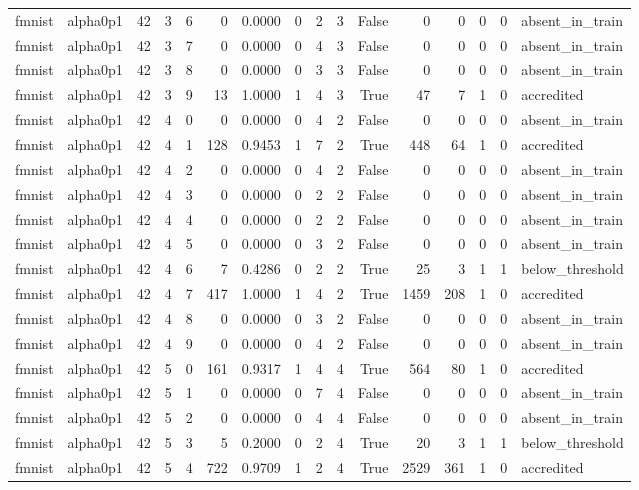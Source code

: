 \begin{tabular}{llrrrrrrrrrrrrrl}
fmnist & alpha0p1 & 42 & 3 & 6 & 0 & 0.0000 & 0 & 2 & 3 & False & 0 & 0 & 0 & 0 & absent\_in\_train \\
fmnist & alpha0p1 & 42 & 3 & 7 & 0 & 0.0000 & 0 & 4 & 3 & False & 0 & 0 & 0 & 0 & absent\_in\_train \\
fmnist & alpha0p1 & 42 & 3 & 8 & 0 & 0.0000 & 0 & 3 & 3 & False & 0 & 0 & 0 & 0 & absent\_in\_train \\
fmnist & alpha0p1 & 42 & 3 & 9 & 13 & 1.0000 & 1 & 4 & 3 & True & 47 & 7 & 1 & 0 & accredited \\
fmnist & alpha0p1 & 42 & 4 & 0 & 0 & 0.0000 & 0 & 4 & 2 & False & 0 & 0 & 0 & 0 & absent\_in\_train \\
fmnist & alpha0p1 & 42 & 4 & 1 & 128 & 0.9453 & 1 & 7 & 2 & True & 448 & 64 & 1 & 0 & accredited \\
fmnist & alpha0p1 & 42 & 4 & 2 & 0 & 0.0000 & 0 & 4 & 2 & False & 0 & 0 & 0 & 0 & absent\_in\_train \\
fmnist & alpha0p1 & 42 & 4 & 3 & 0 & 0.0000 & 0 & 2 & 2 & False & 0 & 0 & 0 & 0 & absent\_in\_train \\
fmnist & alpha0p1 & 42 & 4 & 4 & 0 & 0.0000 & 0 & 2 & 2 & False & 0 & 0 & 0 & 0 & absent\_in\_train \\
fmnist & alpha0p1 & 42 & 4 & 5 & 0 & 0.0000 & 0 & 3 & 2 & False & 0 & 0 & 0 & 0 & absent\_in\_train \\
fmnist & alpha0p1 & 42 & 4 & 6 & 7 & 0.4286 & 0 & 2 & 2 & True & 25 & 3 & 1 & 1 & below\_threshold \\
fmnist & alpha0p1 & 42 & 4 & 7 & 417 & 1.0000 & 1 & 4 & 2 & True & 1459 & 208 & 1 & 0 & accredited \\
fmnist & alpha0p1 & 42 & 4 & 8 & 0 & 0.0000 & 0 & 3 & 2 & False & 0 & 0 & 0 & 0 & absent\_in\_train \\
fmnist & alpha0p1 & 42 & 4 & 9 & 0 & 0.0000 & 0 & 4 & 2 & False & 0 & 0 & 0 & 0 & absent\_in\_train \\
fmnist & alpha0p1 & 42 & 5 & 0 & 161 & 0.9317 & 1 & 4 & 4 & True & 564 & 80 & 1 & 0 & accredited \\
fmnist & alpha0p1 & 42 & 5 & 1 & 0 & 0.0000 & 0 & 7 & 4 & False & 0 & 0 & 0 & 0 & absent\_in\_train \\
fmnist & alpha0p1 & 42 & 5 & 2 & 0 & 0.0000 & 0 & 4 & 4 & False & 0 & 0 & 0 & 0 & absent\_in\_train \\
fmnist & alpha0p1 & 42 & 5 & 3 & 5 & 0.2000 & 0 & 2 & 4 & True & 20 & 3 & 1 & 1 & below\_threshold \\
fmnist & alpha0p1 & 42 & 5 & 4 & 722 & 0.9709 & 1 & 2 & 4 & True & 2529 & 361 & 1 & 0 & accredited \\

\end{tabular}
